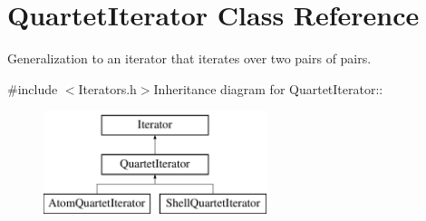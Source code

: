 \hypertarget{classJKBuilder_1_1QuartetIterator}{
\section{QuartetIterator Class Reference}
\label{classJKBuilder_1_1QuartetIterator}
}


Generalization to an iterator that iterates over two pairs of pairs.  


{\ttfamily \#include $<$Iterators.h$>$}Inheritance diagram for QuartetIterator::\begin{figure}[H]
\begin{center}
\leavevmode
\includegraphics[height=3cm]{classJKBuilder_1_1QuartetIterator}
\end{center}
\end{figure}
